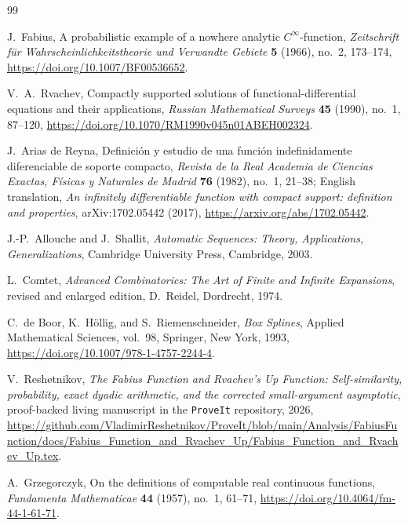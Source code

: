 \clearpage
\begin{thebibliography}{99}

J.~Fabius,
\newblock A probabilistic example of a nowhere analytic $C^\infty$-function,
\newblock \emph{Zeitschrift f\"ur Wahrscheinlichkeitstheorie und Verwandte
Gebiete} \textbf{5} (1966), no.~2, 173--174,
\newblock \url{https://doi.org/10.1007/BF00536652}.

V.~A.~Rvachev,
\newblock Compactly supported solutions of functional-differential equations and
their applications,
\newblock \emph{Russian Mathematical Surveys} \textbf{45} (1990), no.~1,
87--120,
\newblock \url{https://doi.org/10.1070/RM1990v045n01ABEH002324}.

J.~Arias de Reyna,
\newblock Definici\'on y estudio de una funci\'on indefinidamente diferenciable de
soporte compacto,
\newblock \emph{Revista de la Real Academia de Ciencias Exactas, F\'isicas y
Naturales de Madrid} \textbf{76} (1982), no.~1, 21--38;
English translation, \emph{An infinitely differentiable function with compact
support: definition and properties}, arXiv:1702.05442 (2017),
\newblock \url{https://arxiv.org/abs/1702.05442}.

J.-P.~Allouche and J.~Shallit,
\newblock \emph{Automatic Sequences: Theory, Applications, Generalizations},
\newblock Cambridge University Press, Cambridge, 2003.

L.~Comtet,
\newblock \emph{Advanced Combinatorics: The Art of Finite and Infinite Expansions},
\newblock revised and enlarged edition, D.~Reidel, Dordrecht, 1974.

C.~de Boor, K.~H\"ollig, and S.~Riemenschneider,
\newblock \emph{Box Splines},
\newblock Applied Mathematical Sciences, vol.~98, Springer, New York, 1993,
\newblock \url{https://doi.org/10.1007/978-1-4757-2244-4}.

V.~Reshetnikov,
\newblock \emph{The Fabius Function and Rvachev's Up Function: Self-similarity,
probability, exact dyadic arithmetic, and the corrected small-argument
asymptotic},
\newblock proof-backed living manuscript in the \texttt{ProveIt} repository,
2026,
\newblock \url{https://github.com/VladimirReshetnikov/ProveIt/blob/main/Analysis/FabiusFunction/docs/Fabius_Function_and_Rvachev_Up/Fabius_Function_and_Rvachev_Up.tex}.

A.~Grzegorczyk,
\newblock On the definitions of computable real continuous functions,
\newblock \emph{Fundamenta Mathematicae} \textbf{44} (1957), no.~1, 61--71,
\newblock \url{https://doi.org/10.4064/fm-44-1-61-71}.


\end{thebibliography}
